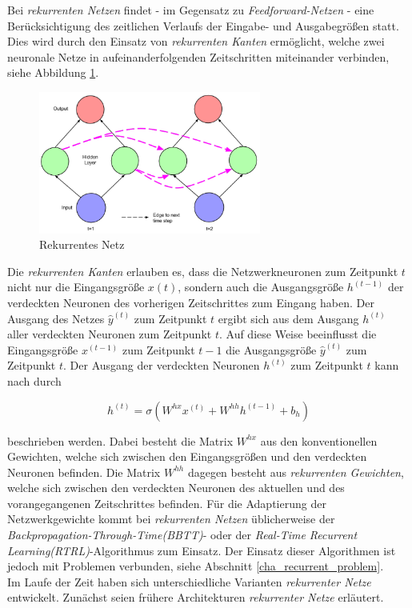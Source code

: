 Bei \textit{rekurrenten Netzen} findet - im Gegensatz zu \textit{Feedforward-Netzen} - eine Berücksichtigung des zeitlichen Verlaufs der Eingabe- und Ausgabegrößen statt. Dies wird durch den Einsatz von \textit{rekurrenten Kanten} ermöglicht, welche zwei neuronale Netze in aufeinanderfolgenden Zeitschritten miteinander verbinden, siehe Abbildung \ref{fig:recurrent}.  

\begin{figure} [h]
	\centering
	\includegraphics[width=0.65\textwidth]{images/recurrent_net}
	\caption{Rekurrentes Netz \cite{Lipton.5292015}}
	\label{fig:recurrent}
\end{figure}

Die \textit{rekurrenten Kanten} erlauben es, dass die Netzwerkneuronen zum Zeitpunkt $t$ nicht nur die Eingangsgröße $x(t)$, sondern auch die Ausgangsgröße $h^{(t-1)}$ der verdeckten Neuronen des vorherigen Zeitschrittes zum Eingang haben. Der Ausgang des Netzes $\hat{y}^{(t)}$ zum Zeitpunkt $t$ ergibt sich aus dem Ausgang $h^{(t)}$ aller verdeckten Neuronen zum Zeitpunkt $t$. Auf diese Weise beeinflusst die Eingangsgröße $x^{(t-1)}$ zum Zeitpunkt $t-1$ die Ausgangsgröße $\hat{y}^{(t)}$ zum Zeitpunkt $t$. Der Ausgang der verdeckten Neuronen $h^{(t)}$ zum Zeitpunkt $t$ kann nach \cite{Lipton.5292015} durch 

\begin{equation}
h^{(t)} = \sigma(W^{hx}x^{(t)} + W^{hh}h^{(t-1)} + b_h)
\end{equation}

beschrieben werden. Dabei besteht die Matrix $W^{hx}$ aus den konventionellen Gewichten, welche sich zwischen den Eingangsgrößen und den verdeckten Neuronen befinden. Die Matrix $W^{hh}$ dagegen besteht aus \textit{rekurrenten Gewichten}, welche sich zwischen den verdeckten Neuronen des aktuellen und des vorangegangenen Zeitschrittes befinden. Für die Adaptierung der Netzwerkgewichte kommt bei \textit{rekurrenten Netzen} üblicherweise der \textit{Backpropagation-Through-Time(BBTT)}- oder der \textit{Real-Time Recurrent Learning(RTRL)}-Algorithmus zum Einsatz. Der Einsatz dieser Algorithmen ist jedoch mit Problemen verbunden, siehe Abschnitt \ref{cha_recurrent_problem}. \\ 
Im Laufe der Zeit haben sich unterschiedliche Varianten \textit{rekurrenter Netze} entwickelt. Zunächst seien frühere Architekturen \textit{rekurrenter Netze} erläutert.


